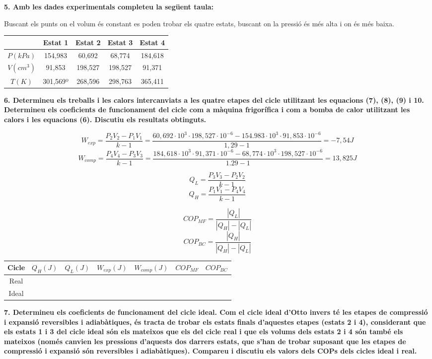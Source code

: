 \documentclass[a4paper]{article}
\begin{document}
\textbf{5. Amb les dades experimentals completeu la següent taula:}

Buscant els punts on el volum és constant es poden trobar els quatre estats, buscant on la pressió és més alta i on és més baixa.

\begin{tabular}{c|cccc}
    & Estat 1 & Estat 2 & Estat 3 & Estat 4 \\
    \hline
    $P(kPa)$ & 154,983 & 60,692 & 68,774 & 184,618 \\
    $V(cm^3)$ & 91,853 & 198,527 & 198,527 & 91,371 \\
    $T(K)$ & 301,569º & 268,596 & 298,763 & 365,411 \\
\end{tabular}

\textbf{6. Determineu els treballs i les calors intercanviats a les quatre etapes del cicle utilitzant les equacions (7), (8), (9) i 10. Determineu els coeficients de funcionament del cicle com a màquina frigorífica i com a bomba de calor utilitzant les calors i les equacions (6). Discutiu els resultats obtinguts.}

$$ W_{exp} = \frac{P_2 V_2 - P_1 V_1}{k - 1} = 
\frac{60,692·10^3 · 198,527·10^{-6} - 154.983·10^3 · 91,853·10^{-6}}{1,29 - 1} = \boxed{-7,54J} 
$$
$$ W_{comp} = \frac{P_4 V_4 - P_3 V_3}{k - 1} = 
\frac{184,618·10^3 · 91,371·10^{-6} - 68,774·10^3 · 198,527·10^{-6}}{1.29 - 1} = \boxed{13,825J}
$$

$$ Q_L = \frac{P_3 V_3 - P_2 V_2}{k - 1} $$
$$ Q_H = \frac{P_1 V_1 - P_4 V_4}{k - 1} $$

$$ COP_{MF} = \frac{|Q_L|}{|Q_H| - |Q_L|} $$
$$ COP_{BC} = \frac{|Q_H|}{|Q_H| - |Q_L|} $$

\begin{tabular}{c|cccccc}
    Cicle & $Q_H(J)$ & $Q_L(J)$ & $W_{exp}(J)$ & $W_{comp}(J)$ & $COP_{MF}$ & $COP_{BC}$ \\
    \hline
    Real & & & & & & \\
    Ideal & & & & & &
\end{tabular}

\textbf{7. Determineu els coeficients de funcionament del cicle ideal. Com el cicle ideal d’Otto invers té les etapes de compressió i expansió reversibles i adiabàtiques, és tracta de trobar els estats finals d’aquestes etapes (estats 2 i 4), considerant que els estats 1 i 3 del cicle ideal són els mateixos que els del cicle real i que els volums dels estats 2 i 4 són també els mateixos (només canvien les pressions d’aquests dos darrers estats, que s’han de trobar suposant que les etapes de compressió i expansió són reversibles i adiabàtiques). Compareu i discutiu els valors dels COPs dels cicles ideal i real.}
\end{document}
